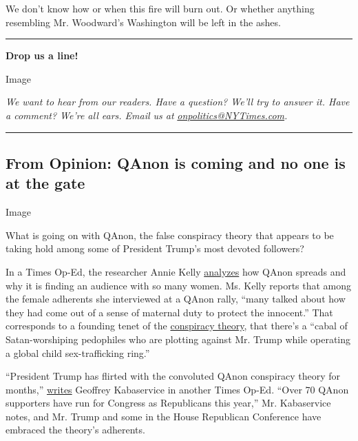 We don't know how or when this fire will burn out. Or whether anything
resembling Mr. Woodward's Washington will be left in the ashes.

\begin{center}\rule{0.5\linewidth}{\linethickness}\end{center}

\textbf{Drop us a line!}

Image

\emph{We want to hear from our readers. Have a question? We'll try to
answer it. Have a comment? We're all ears. Email us at}
\href{mailto:onpolitics@NYTimes.com}{\emph{onpolitics@NYTimes.com}}\emph{.}

\begin{center}\rule{0.5\linewidth}{\linethickness}\end{center}

\hypertarget{from-opinion-qanon-is-coming-and-no-one-is-at-the-gate}{%
\subsection{From Opinion: QAnon is coming and no one is at the
gate}\label{from-opinion-qanon-is-coming-and-no-one-is-at-the-gate}}

Image

What is going on with QAnon, the false conspiracy theory that appears to
be taking hold among some of President Trump's most devoted followers?

In a Times Op-Ed, the researcher Annie Kelly
\href{https://www.nytimes3xbfgragh.onion/2020/09/10/opinion/qanon-women-conspiracy.html}{analyzes}
how QAnon spreads and why it is finding an audience with so many women.
Ms. Kelly reports that among the female adherents she interviewed at a
QAnon rally, ``many talked about how they had come out of a sense of
maternal duty to protect the innocent.'' That corresponds to a founding
tenet of the
\href{https://www.nytimes3xbfgragh.onion/article/what-is-qanon.html}{conspiracy
theory}, that there's a ``cabal of Satan-worshiping pedophiles who are
plotting against Mr. Trump while operating a global child
sex-trafficking ring.''

``President Trump has flirted with the convoluted QAnon conspiracy
theory for months,''
\href{https://www.nytimes3xbfgragh.onion/2020/08/25/opinion/trump-qanon-birchers.html}{writes}
Geoffrey Kabaservice in another Times Op-Ed. ``Over 70 QAnon supporters
have run for Congress as Republicans this year,'' Mr. Kabaservice notes,
and Mr. Trump and some in the House Republican Conference have embraced
the theory's adherents.

